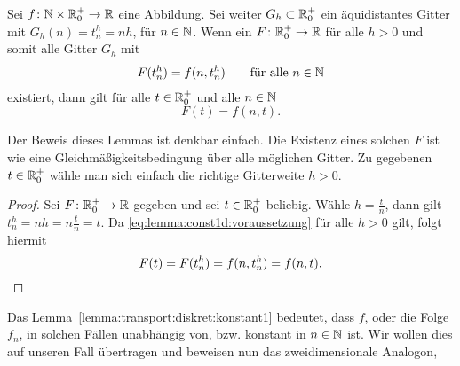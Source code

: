 \begin{lemma} \label{lemma:transport:diskret:konstant1}
Sei $f\colon \mathbb N \times \mathbb R^+_0 \to \mathbb R$ eine Abbildung.
Sei weiter $G_h \subset \mathbb R^+_0$ ein äquidistantes Gitter mit $G_h(n) = t^h_n = n h$, für $n \in \mathbb N$.
Wenn ein $F\colon \mathbb R^+_0 \to \mathbb R$ für alle $h > 0$ und somit alle Gitter $G_h$ mit
\begin{align}\label{eq:lemma:const1d:voraussetzung}
F(t^h_n) = f(n, t^h_n) \qquad \text{für alle $n \in \mathbb N$}
\end{align}
existiert, dann gilt für alle $t \in \mathbb R^+_0$ und alle $n \in \mathbb N$
\[ F(t) = f(n, t). \]
\end{lemma}
Der Beweis dieses Lemmas ist denkbar einfach. Die Existenz eines solchen $F$ ist wie eine Gleichmäßigkeitsbedingung über alle möglichen Gitter.
Zu gegebenen $t \in \mathbb R^+_0$ wähle man sich einfach die richtige Gitterweite $h > 0$.
\begin{proof}
Sei $F\colon \mathbb R^+_0 \to \mathbb R$ gegeben und sei $t \in \mathbb R^+_0$ beliebig.
Wähle $h = \frac{t}{n}$, dann gilt $t^h_n = nh = n \frac{t}{n} = t$.
Da \eqref{eq:lemma:const1d:voraussetzung} für alle $h > 0$ gilt, folgt hiermit 
\[ F(t) = F(t^h_n) = f(n, t^h_n) = f(n, t). \qedhere \]
\end{proof}

Das Lemma~\ref{lemma:transport:diskret:konstant1} bedeutet, dass $f$, oder die Folge $f_n$, in solchen Fällen unabhängig von, bzw. konstant in $n \in \mathbb N$ ist.
Wir wollen dies auf unseren Fall übertragen und beweisen nun das zweidimensionale Analogon, 

